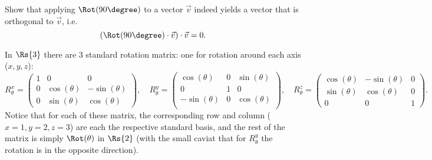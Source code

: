 \begin{challange}
  Show that applying $\Rot(90\degree)$ to a vector $\vec{v}$ indeed yields a vector that is orthogonal to $\vec{v}$, i.e.
  \begin{equation*}
	\left(\Rot(90\degree)\cdot\vec{v}\right) \cdot \vec{v} = 0.
  \end{equation*}
\end{challange}

In $\Rs{3}$ there are 3 standard rotation matrix: one for rotation around each axis ($x, y, z$):
\begin{equation*}
  R^{x}_{\theta} = \begin{pmatrix}
					 1 & 0 & 0\\
					 0 & \cos(\theta) & -\sin(\theta)\\
					 0 & \sin(\theta) & \cos(\theta)
				   \end{pmatrix},\quad
  R^{y}_{\theta} = \begin{pmatrix}
					 \cos(\theta) & 0 & \sin(\theta)\\
					 0 & 1 & 0\\
					 -\sin(\theta) & 0 & \cos(\theta)\\
				   \end{pmatrix},\quad
  R^{z}_{\theta} = \begin{pmatrix}
					 \cos(\theta) & -\sin(\theta) & 0\\
					 \sin(\theta) & \cos(\theta) & 0\\
					 0 & 0 & 1
				   \end{pmatrix}.
\end{equation*}
Notice that for each of these matrix, the corresponding row and column ($x=1, y=2, z=3$) are each the respective standard basis, and the rest of the matrix is simply $\Rot(\theta)$ in $\Rs{2}$ (with the small caviat that for $R^{y}_{\theta}$ the rotation is in the opposite direction).

